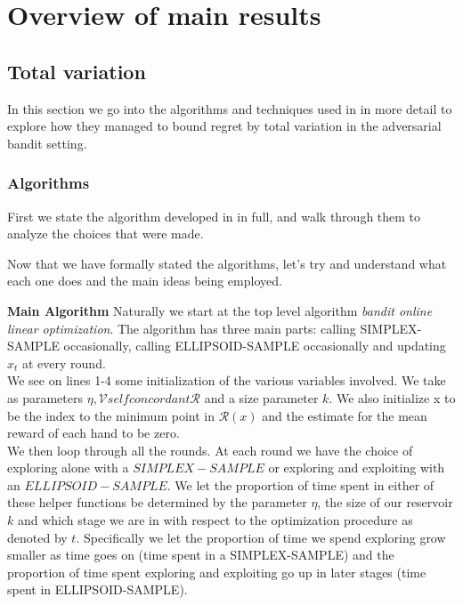 \section{Overview of main results}

\subsection{Total variation}
In this section we go into the algorithms and techniques used in \citep{hazan}
in more detail to explore how they managed to bound regret by total variation in the
adversarial bandit setting.

\subsubsection{Algorithms}
First we state the algorithm developed in \citep{hazan} in full, and walk through them
to analyze the choices that were made.





Now that we have formally stated the algorithms, let's try and understand
what each one does and the main ideas being employed. 

\textbf{Main Algorithm}
Naturally we start at the top level algorithm \textit{bandit online linear optimization}.
The algorithm has three main parts: calling SIMPLEX-SAMPLE occasionally, calling ELLIPSOID-SAMPLE
occasionally and updating $x_t$ at every round. \\

We see on lines 1-4 some initialization of the various variables involved. 
We take as parameters $\eta, \mathcal{V} self concordant \mathcal{R}$ and a size 
parameter $k$. We also initialize x to be the index to the minimum point in $\mathcal{R}(x)$ 
and the estimate for the mean reward of each hand to be zero. \\

We then loop through all the rounds. At each round we have the choice of exploring alone 
with a $SIMPLEX-SAMPLE$ or exploring and exploiting with an $ELLIPSOID-SAMPLE$. We 
let the proportion of time spent in either of these helper functions be determined by 
the parameter $\eta$, the size of our reservoir $k$ and which stage we are in with respect to
the optimization procedure as denoted by $t$. Specifically we let the proportion of time 
we spend exploring grow smaller as time goes on (time spent in a SIMPLEX-SAMPLE) and the proportion of time spent exploring and exploiting go up in later stages (time spent in ELLIPSOID-SAMPLE).\\

